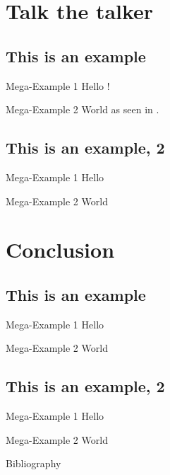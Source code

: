 \documentclass[aspectratio=169,usepdftitle=true,t]{beamer}
\begin{document}
\section{Talk the talker}
\subsection{This is an example}

\begin{frame}{Mega-Example 1}
    Hello \cite{dirac}!
\end{frame}

\begin{frame}{Mega-Example 2}
    World as seen in \cite{einstein}.
\end{frame}

\subsection{This is an example, 2}

\begin{frame}{Mega-Example 1}
    Hello
\end{frame}

\begin{frame}{Mega-Example 2}
    World
\end{frame}


\section{Conclusion}
\subsection{This is an example}

\begin{frame}{Mega-Example 1}
    Hello
\end{frame}

\begin{frame}{Mega-Example 2}
    World
\end{frame}

\subsection{This is an example, 2}

\begin{frame}{Mega-Example 1}
    Hello
\end{frame}

\begin{frame}{Mega-Example 2}
    World
\end{frame}

\begin{frame}{Bibliography}
    \printbibliography
\end{frame}
\end{document}
